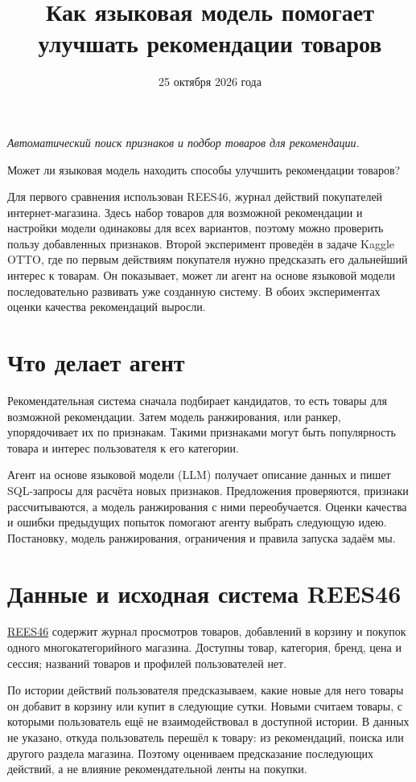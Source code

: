 \documentclass[11pt,a4paper]{article}
\title{Как языковая модель помогает улучшать рекомендации товаров}
\author{}
\date{25 октября 2026 года}
\begin{document}
\maketitle
\textit{Автоматический поиск признаков и подбор товаров для рекомендации.}

Может ли языковая модель находить способы улучшить рекомендации товаров?

Для первого сравнения использован REES46, журнал действий покупателей интернет-магазина. Здесь набор товаров для возможной рекомендации и настройки модели одинаковы для всех вариантов, поэтому можно проверить пользу добавленных признаков. Второй эксперимент проведён в задаче Kaggle OTTO, где по первым действиям покупателя нужно предсказать его дальнейший интерес к товарам. Он показывает, может ли агент на основе языковой модели последовательно развивать уже созданную систему. В обоих экспериментах оценки качества рекомендаций выросли.

\section{Что делает агент}
Рекомендательная система сначала подбирает кандидатов, то есть товары для возможной рекомендации. Затем модель ранжирования, или ранкер, упорядочивает их по признакам. Такими признаками могут быть популярность товара и интерес пользователя к его категории.

Агент на основе языковой модели (LLM) получает описание данных и пишет SQL-запросы для расчёта новых признаков. Предложения проверяются, признаки рассчитываются, а модель ранжирования с ними переобучается. Оценки качества и ошибки предыдущих попыток помогают агенту выбрать следующую идею. Постановку, модель ранжирования, ограничения и правила запуска задаём мы.

\section{Данные и исходная система REES46}
\href{https://www.kaggle.com/datasets/mkechinov/ecommerce-behavior-data-from-multi-category-store}{REES46} содержит журнал просмотров товаров, добавлений в корзину и покупок одного многокатегорийного магазина. Доступны товар, категория, бренд, цена и сессия; названий товаров и профилей пользователей нет.

По истории действий пользователя предсказываем, какие новые для него товары он добавит в корзину или купит в следующие сутки. Новыми считаем товары, с которыми пользователь ещё не взаимодействовал в доступной истории. В данных не указано, откуда пользователь перешёл к товару: из рекомендаций, поиска или другого раздела магазина. Поэтому оцениваем предсказание последующих действий, а не влияние рекомендательной ленты на покупки.
\end{document}
